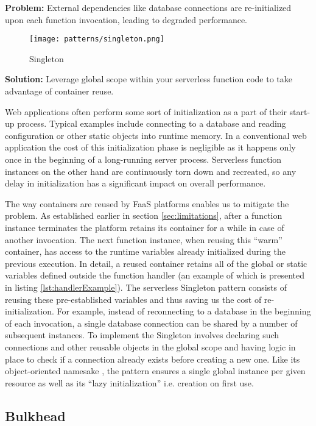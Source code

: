 \textbf{Problem:} External dependencies like database connections are re-initialized upon each function invocation, leading to degraded performance.

\begin{figure}[h]
  \centering
  \texttt{[image: patterns/singleton.png]}
  \caption{Singleton}
  \label{fig:singleton}
\end{figure}

\textbf{Solution:} Leverage global scope within your serverless function code to take advantage of container reuse.

Web applications often perform some sort of initialization as a part of their start-up process. Typical examples include connecting to a database and reading configuration or other static objects into runtime memory. In a conventional web application the cost of this initialization phase is negligible as it happens only once in the beginning of a long-running server process. Serverless function instances on the other hand are continuously torn down and recreated, so any delay in initialization has a significant impact on overall performance.

The way containers are reused by FaaS platforms enables us to mitigate the problem. As established earlier in section \ref{sec:limitations}, after a function instance terminates the platform retains its container for a while in case of another invocation. The next function instance, when reusing this ``warm'' container, has access to the runtime variables already initialized during the previous execution. In detail, a reused container retains all of the global or static variables defined outside the function handler (an example of which is presented in listing \ref{lst:handlerExample}). The serverless Singleton pattern consists of reusing these pre-established variables and thus saving us the cost of re-initialization. For example, instead of reconnecting to a database in the beginning of each invocation, a single database connection can be shared by a number of subsequent instances. To implement the Singleton involves declaring such connections and other reusable objects in the global scope and having logic in place to check if a connection already exists before creating a new one. Like its object-oriented namesake \parencite{gamma94designPatterns}, the pattern ensures a single global instance per given resource as well as its ``lazy initialization'' i.e. creation on first use. \parencite{aws18serverlessLens}

\subsection{Bulkhead} \label{subsec:Bulkhead}

